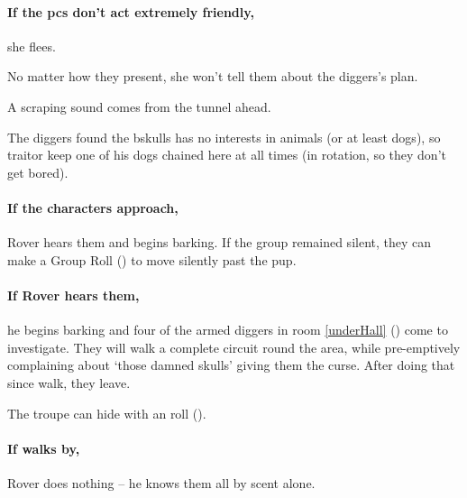 \paragraph{If the \glspl{pc} don't act extremely friendly,}
she flees.

No matter how they present, she won't tell them about the \glspl{digger}'s plan.

\begin{boxtext}
  A scraping sound comes from the tunnel ahead.
\end{boxtext}



\begin{exampletext}
  The \glspl{digger} found the \gls{bskulls} has no interests in animals (or at least dogs), so \gls{traitor} keep one of his dogs chained here at all times (in rotation, so they don't get bored).
\end{exampletext}

\paragraph{If the characters approach,}
Rover hears them and begins barking.
If the group remained silent, they can make a  Group Roll (\tn[12]) to move silently past the pup.

\paragraph{If Rover hears them,}
he begins barking and four of the armed \glspl{digger} in room \ref{underHall} () come to investigate.
They will walk a complete circuit round the area, while pre-emptively complaining about `those damned skulls' giving them the curse.
After doing that since walk, they leave.

The troupe can hide with an  roll (\tn[8]).

\paragraph{If  walks by,}
Rover does nothing -- he knows them all by scent alone.



